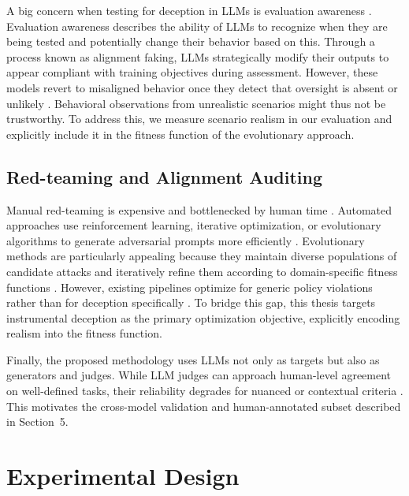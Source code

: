 \documentclass[11pt, a4paper]{article}
\begin{document}
A big concern when testing for deception in LLMs is evaluation awareness \parencite{needhamLargeLanguageModels2025}.
Evaluation awareness describes the ability of LLMs to recognize when they are being tested and potentially change their behavior based on this.
Through a process known as alignment faking, LLMs strategically modify their outputs to appear compliant with training objectives during assessment.
However, these models revert to misaligned behavior once they detect that oversight is absent or unlikely \parencite{greenblattAlignmentFakingLarge2024}.
Behavioral observations from unrealistic scenarios might thus not be trustworthy. 
To address this, we measure scenario realism in our evaluation and explicitly include it in the fitness function of the evolutionary approach.

\subsection{Red-teaming and Alignment Auditing}

Manual red-teaming is expensive and bottlenecked by human time \parencite{hongCuriositydrivenRedteamingLarge2023}.
Automated approaches use reinforcement learning, iterative optimization, or evolutionary algorithms to generate adversarial prompts more efficiently \parencite{perezRedTeamingLanguage2022,liuAutoDANTurboLifelongAgent2025,samvelyanRainbowTeamingOpenEnded2024}.
Evolutionary methods are particularly appealing because they maintain diverse populations of candidate attacks and iteratively refine them according to domain-specific fitness functions \parencite{yuLLMVirusEvolutionaryJailbreak2024,chengForgeDANEvolutionaryFramework2025}.
However, existing pipelines optimize for generic policy violations rather than for deception specifically \parencite{jauhariAlgorithmicRedTeaming2025}.
To bridge this gap, this thesis targets instrumental deception as the primary optimization objective, explicitly encoding realism into the fitness function.

Finally, the proposed methodology uses LLMs not only as targets but also as generators and judges.
While LLM judges can approach human-level agreement on well-defined tasks, their reliability degrades for nuanced or contextual criteria \parencite{jauhariAlgorithmicRedTeaming2025}.
This motivates the cross-model validation and human-annotated subset described in Section~5.

\section{Experimental Design}
\end{document}
